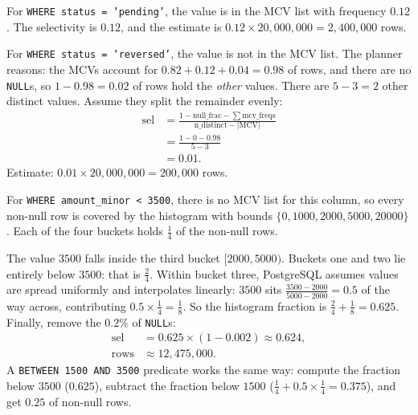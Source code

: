 \begin{example}
\label{ch07:ex-mcv-hit}
For \texttt{WHERE status = 'pending'}, the value is in the MCV list with frequency $0.12$. The selectivity is $0.12$, and the estimate is $0.12 \times 20{,}000{,}000 = 2{,}400{,}000$ rows.
\end{example}

\begin{example}
\label{ch07:ex-mcv-miss}
For \texttt{WHERE status = 'reversed'}, the value is not in the MCV list. The planner reasons: the MCVs account for $0.82 + 0.12 + 0.04 = 0.98$ of rows, and there are no \texttt{NULL}s, so $1 - 0.98 = 0.02$ of rows hold the \emph{other} values. There are $5 - 3 = 2$ other distinct values. Assume they split the remainder evenly:
\begin{align*}
  \text{sel} &= \frac{1 - \text{null\_frac} - \sum \text{mcv\_freqs}}{\text{n\_distinct} - |\text{MCV}|} \\
  &= \frac{1 - 0 - 0.98}{5 - 3} \\
  &= 0.01.
\end{align*}
Estimate: $0.01 \times 20{,}000{,}000 = 200{,}000$ rows.
\end{example}

\begin{example}
\label{ch07:ex-histogram}
For \texttt{WHERE amount\_minor < 3500}, there is no MCV list for this column, so every non-null row is covered by the histogram with bounds $\{0, 1000, 2000, 5000, 20000\}$. Each of the four buckets holds $\tfrac14$ of the non-null rows.

The value $3500$ falls inside the third bucket $[2000, 5000)$. Buckets one and two lie entirely below $3500$: that is $\tfrac24$. Within bucket three, PostgreSQL assumes values are spread uniformly and interpolates linearly: $3500$ sits $\tfrac{3500 - 2000}{5000 - 2000} = 0.5$ of the way across, contributing $0.5 \times \tfrac14 = \tfrac18$. So the histogram fraction is $\tfrac24 + \tfrac18 = 0.625$. Finally, remove the $0.2\%$ of \texttt{NULL}s:
\begin{align*}
  \text{sel} &= 0.625 \times (1 - 0.002) \approx 0.624, \\
  \text{rows} &\approx 12{,}475{,}000.
\end{align*}
A \texttt{BETWEEN 1500 AND 3500} predicate works the same way: compute the fraction below $3500$ ($0.625$), subtract the fraction below $1500$ ($\tfrac14 + 0.5 \times \tfrac14 = 0.375$), and get $0.25$ of non-null rows.
\end{example}

